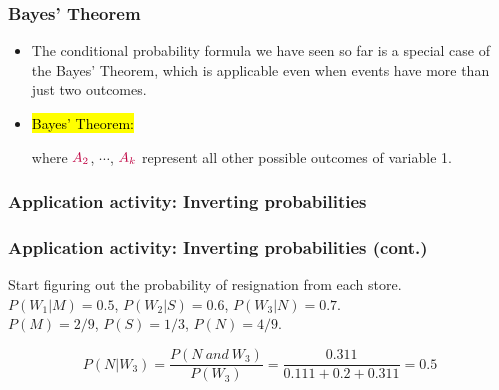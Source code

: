 \documentclass[notes,11pt, aspectratio=169]{beamer}
\begin{document}
\begin{frame}
\frametitle{Bayes' Theorem}

\begin{itemize}

\item The conditional probability formula we have seen so far is a special case of the Bayes' Theorem, which is applicable even when events have more than just two outcomes.

\pause 

\item \hl{Bayes' Theorem:}


where $\textcolor{purple}{A_2}$, $\cdots$, $\textcolor{purple}{A_k}$ represent all other possible outcomes of variable 1.

\end{itemize}

\end{frame}


\begin{frame}
\frametitle{Application activity: Inverting probabilities}


\end{frame}


\begin{frame}
\frametitle{Application activity: Inverting probabilities (cont.)}

Start figuring out the probability of resignation from each store.
\\
\pause
$P(W_{1}|M) = 0.5$, $P(W_{2}|S) = 0.6$, $P(W_{3}|N) = 0.7$. \\
$P(M) = 2/9$, $P(S) = 1/3$, $P(N) = 4/9$. \\

\pause

\[ P(N| W_3) = \frac{P(N~and~W_3)}{P(W_3)} = \frac{0.311}{0.111 + 0.2 + 0.311} = 0.5 \]
\end{frame}
\end{document}
